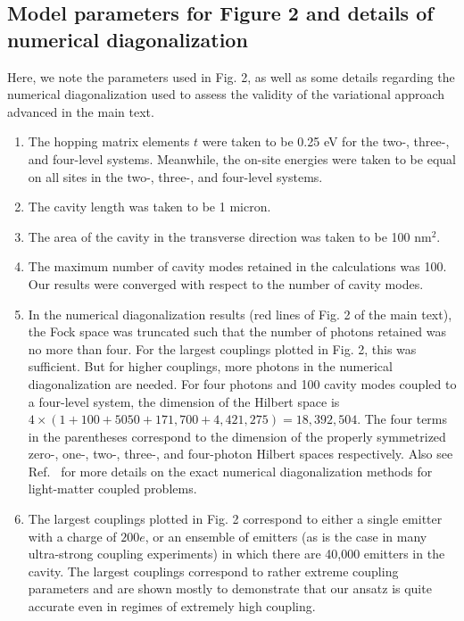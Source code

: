 \documentclass[aps,prb,onecolumn,preprint,
	groupedaddress,superscriptaddress,
	amsfonts,amssymb,amsmath,floatfix,
	citeautoscript]{revtex4-1}
\begin{document}
\subsection{Model parameters for Figure 2 and details of numerical diagonalization}

Here, we note the parameters used in Fig. 2, as well as some details regarding the numerical diagonalization used to assess the validity of the variational approach advanced in the main text.

\begin{enumerate}
\item{The hopping matrix elements $t$ were taken to be 0.25 eV for the two-, three-, and four-level systems. Meanwhile, the on-site energies were taken to be equal on all sites in the two-, three-, and four-level systems.}
\item{The cavity length was taken to be 1 micron.}
\item{The area of the cavity in the transverse direction was taken to be 100 nm$^2$.}
\item{The maximum number of cavity modes retained in the calculations was 100. Our results were converged with respect to the number of cavity modes.}
\item{In the numerical diagonalization results (red lines of Fig. 2 of the main text), the Fock space was truncated such that the number of photons retained was no more than four. For the largest couplings plotted in Fig. 2, this was sufficient. But for higher couplings, more photons in the numerical diagonalization are needed. For four photons and 100 cavity modes coupled to a four-level system, the dimension of the Hilbert space is  $4\times \left( 1 + 100 + 5050 + 171,700 + 4,421,275 \right) = 18,392,504$. The four terms in the parentheses correspond to the dimension of the properly symmetrized zero-, one-, two-, three-, and four-photon Hilbert spaces respectively. Also see Ref.~\cite{flick2017} for more details on the exact numerical diagonalization methods for light-matter coupled problems.}
\item{The largest couplings plotted in Fig. 2 correspond to either a single emitter with a charge of $200e$, or an ensemble of emitters (as is the case in many ultra-strong coupling experiments) in which there are 40,000 emitters in the cavity. The largest couplings correspond to rather extreme coupling parameters and are shown mostly to demonstrate that our ansatz is quite accurate even in regimes of extremely high coupling.}
\end{enumerate}
\end{document}
